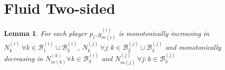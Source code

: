 \documentclass{article}
\newtheorem{lemma}[theorem]{Lemma}
\begin{document}
\section{Fluid Two-sided}
\label{app:fluid-two-sided}
\begin{lemma}
    For each player $p_i, g^{(i)}_{m(i)}$ is monotonically increasing in $N^{(i)}_k\ \forall k\in \mathcal{B}_1^{(i)}\cup \mathcal{B}_3^{(i)}$, $N^{(j)}_{k}\ \forall j:k\in\mathcal{B}_2^{(j)}\cup\mathcal{B}_3^{(j)}$ and monotonically decreasing in $N^{(k)}_{m(k)}\forall k\in \mathcal{B}_3^{(i)}$ and $N^{(j)}_{m(j)}\ \forall j:k\in\mathcal{B}_3^{(j)}$
\end{lemma}
\end{document}

